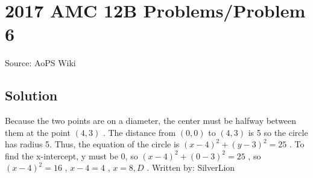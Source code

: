 \documentclass[12pt]{article}
\begin{document}
\section*{{2017 AMC 12B Problems/Problem 6}}
Source: AoPS Wiki

\subsection*{Solution}
Because the two points are on a diameter, the center must be halfway between them at the point $(4,3)$ . The distance from $(0,0)$ to $(4,3)$ is 5 so the circle has radius 5. Thus, the equation of the circle is $(x-4)^2+(y-3)^2=25$ . To find the x-intercept, y must be 0, so $(x-4)^2+(0-3)^2=25$ , so $(x-4)^2=16$ , $x-4=4$ , $x=8, \boxed{D}$ . Written by: SilverLion
\end{document}
